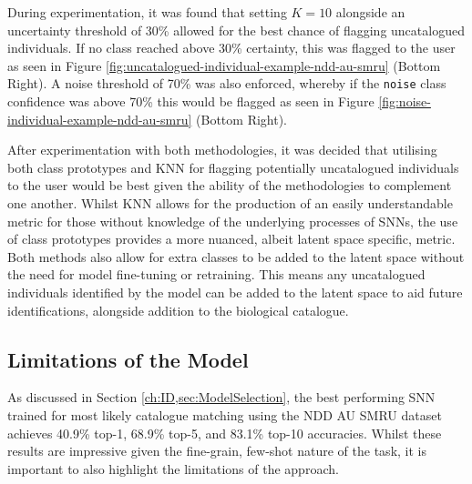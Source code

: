 During experimentation, it was found that setting $K = 10$ alongside an uncertainty threshold of 30\% allowed for the best chance of flagging uncatalogued individuals. If no class reached above 30\% certainty, this was flagged to the user as seen in Figure \ref{fig:uncatalogued-individual-example-ndd-au-smru} (Bottom Right). A noise threshold of 70\% was also enforced, whereby if the \texttt{noise} class confidence was above 70\% this would be flagged as seen in Figure \ref{fig:noise-individual-example-ndd-au-smru} (Bottom Right).

After experimentation with both methodologies, it was decided that utilising both class prototypes and KNN for flagging potentially uncatalogued individuals to the user would be best given the ability of the methodologies to complement one another. Whilst KNN allows for the production of an easily understandable metric for those without knowledge of the underlying processes of SNNs, the use of class prototypes provides a more nuanced, albeit latent space specific, metric. Both methods also allow for extra classes to be added to the latent space without the need for model fine-tuning or retraining. This means any uncatalogued individuals identified by the model can be added to the latent space to aid future identifications, alongside addition to the biological catalogue.

\subsection{Limitations of the Model}\label{ch:ID,sec:ModelSelection,subsec:limitations}

As discussed in Section \ref{ch:ID,sec:ModelSelection}, the best performing SNN trained for most likely catalogue matching using the NDD AU SMRU dataset achieves 40.9\% top-1, 68.9\% top-5, and 83.1\% top-10 accuracies. Whilst these results are impressive given the fine-grain, few-shot nature of the task, it is important to also highlight the limitations of the approach. 

